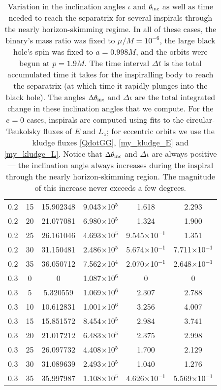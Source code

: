 \documentclass[aps,prd,twocolumn,showpacs,groupedaddress,nofootinbib]{revtex4}
\begin{document}
\begin{widetext}
\begin{table}
\begin{tabular}{|c|c|c|c|c|c|}
  0.2& 15& 15.902348&  9.043$\times$10$^{5}$&  1.618&  2.293\\
  0.2& 20& 21.077081&  6.980$\times$10$^{5}$&  1.324&  1.900\\
  0.2& 25& 26.161046&  4.693$\times$10$^{5}$&  9.545$\times$10$^{-1}$&  1.351\\
  0.2& 30& 31.150481&  2.486$\times$10$^{5}$&  5.674$\times$10$^{-1}$&  7.711$\times$10$^{-1}$\\
  0.2& 35& 36.050712&  7.562$\times$10$^4$&  2.070$\times$10$^{-1}$&  2.648$\times$10$^{-1}$\\
  0.3&  0&  0&  1.087$\times$10$^{6}$&  0&  0\\
  0.3&  5&  5.320559&  1.069$\times$10$^{6}$&  2.307&  2.788\\
  0.3& 10& 10.612831&  1.001$\times$10$^{6}$&  3.256&  4.007\\
  0.3& 15& 15.851572&  8.454$\times$10$^{5}$&  2.984&  3.741\\
  0.3& 20& 21.017212&  6.483$\times$10$^{5}$&  2.375&  2.998\\
  0.3& 25& 26.097732&  4.408$\times$10$^{5}$&  1.700&  2.129\\
  0.3& 30& 31.089639&  2.493$\times$10$^{5}$&  1.040&  1.276\\
  0.3& 35& 35.997987&  1.108$\times$10$^{5}$&  4.626$\times$10$^{-1}$&  5.569$\times$10$^{-1}$\\
\hline
\end{tabular}
\caption{Variation in the inclination angles $\iota$ and $\theta_{\rm
  inc}$ as well as time needed to reach the separatrix for several
  inspirals through the nearly horizon-skimming regime.  In all of
  these cases, the binary's mass ratio was fixed to $\mu/M = 10^{-6}$,
  the large black hole's spin was fixed to $a = 0.998M$, and the
  orbits were begun at $p = 1.9M$.  The time interval $\Delta t$ is
  the total accumulated time it takes for the inspiralling body to
  reach the separatrix (at which time it rapidly plunges into the
  black hole).  The angles $\Delta\theta_{\rm inc}$ and $\Delta\iota$
  are the total integrated change in these inclination angles that we
  compute.  For the $e = 0$ cases, inspirals are computed using fits
  to the circular-Teukolsky fluxes of $E$ and $L_z$; for eccentric
  orbits we use the kludge fluxes {\eqref{QdotGG}},
  {\eqref{my_kludge_E}} and {\eqref{my_kludge_L}}.  Notice that
  $\Delta \theta_{\rm inc}$ and $\Delta \iota$ are always positive ---
  the inclination angle always increases during the inspiral through
  the nearly horizon-skimming region.  The magnitude of this increase
  never exceeds a few degrees.\label{delta_inc}}
\end{table}

\end{widetext}
\end{document}
